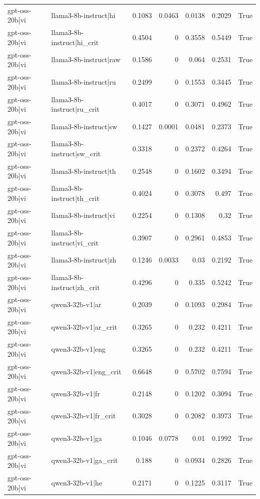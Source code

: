 \begin{table}
\begin{tabular}{l l r r r r l}
gpt-oss-20b|vi & llama3-8b-instruct|hi & 0.1083 & 0.0463 & 0.0138 & 0.2029 & True \\
gpt-oss-20b|vi & llama3-8b-instruct|hi_crit & 0.4504 & 0 & 0.3558 & 0.5449 & True \\
gpt-oss-20b|vi & llama3-8b-instruct|raw & 0.1586 & 0 & 0.064 & 0.2531 & True \\
gpt-oss-20b|vi & llama3-8b-instruct|ru & 0.2499 & 0 & 0.1553 & 0.3445 & True \\
gpt-oss-20b|vi & llama3-8b-instruct|ru_crit & 0.4017 & 0 & 0.3071 & 0.4962 & True \\
gpt-oss-20b|vi & llama3-8b-instruct|sw & 0.1427 & 0.0001 & 0.0481 & 0.2373 & True \\
gpt-oss-20b|vi & llama3-8b-instruct|sw_crit & 0.3318 & 0 & 0.2372 & 0.4264 & True \\
gpt-oss-20b|vi & llama3-8b-instruct|th & 0.2548 & 0 & 0.1602 & 0.3494 & True \\
gpt-oss-20b|vi & llama3-8b-instruct|th_crit & 0.4024 & 0 & 0.3078 & 0.497 & True \\
gpt-oss-20b|vi & llama3-8b-instruct|vi & 0.2254 & 0 & 0.1308 & 0.32 & True \\
gpt-oss-20b|vi & llama3-8b-instruct|vi_crit & 0.3907 & 0 & 0.2961 & 0.4853 & True \\
gpt-oss-20b|vi & llama3-8b-instruct|zh & 0.1246 & 0.0033 & 0.03 & 0.2192 & True \\
gpt-oss-20b|vi & llama3-8b-instruct|zh_crit & 0.4296 & 0 & 0.335 & 0.5242 & True \\
gpt-oss-20b|vi & qwen3-32b-v1|ar & 0.2039 & 0 & 0.1093 & 0.2984 & True \\
gpt-oss-20b|vi & qwen3-32b-v1|ar_crit & 0.3265 & 0 & 0.232 & 0.4211 & True \\
gpt-oss-20b|vi & qwen3-32b-v1|eng & 0.3265 & 0 & 0.232 & 0.4211 & True \\
gpt-oss-20b|vi & qwen3-32b-v1|eng_crit & 0.6648 & 0 & 0.5702 & 0.7594 & True \\
gpt-oss-20b|vi & qwen3-32b-v1|fr & 0.2148 & 0 & 0.1202 & 0.3094 & True \\
gpt-oss-20b|vi & qwen3-32b-v1|fr_crit & 0.3028 & 0 & 0.2082 & 0.3973 & True \\
gpt-oss-20b|vi & qwen3-32b-v1|ga & 0.1046 & 0.0778 & 0.01 & 0.1992 & True \\
gpt-oss-20b|vi & qwen3-32b-v1|ga_crit & 0.188 & 0 & 0.0934 & 0.2826 & True \\
gpt-oss-20b|vi & qwen3-32b-v1|he & 0.2171 & 0 & 0.1225 & 0.3117 & True \\

\end{tabular}
\end{table}
